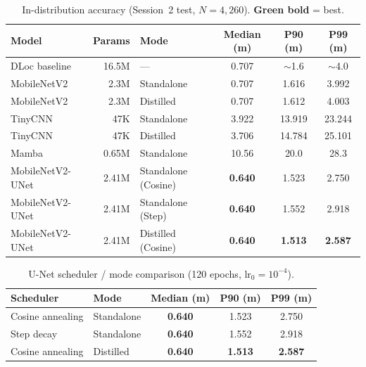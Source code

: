 \documentclass[11pt]{article}
\newcommand{\best}[1]{\textbf{\textcolor{green!50!black}{#1}}}
\begin{document}
\begin{table}[h]\centering\footnotesize
\caption{In-distribution accuracy (Session~2 test, $N=4{,}260$). \best{Green bold} = best.}
\begin{tabular}{@{}lrlccc@{}}
\toprule
\textbf{Model} & \textbf{Params} & \textbf{Mode} & \textbf{Median (m)} & \textbf{P90 (m)} & \textbf{P99 (m)} \\
\midrule
DLoc baseline    & 16.5M & ---                 & 0.707 & $\sim$1.6 & $\sim$4.0 \\
MobileNetV2      & 2.3M  & Standalone          & 0.707 & 1.616 & 3.992 \\
MobileNetV2      & 2.3M  & Distilled           & 0.707 & 1.612 & 4.003 \\
TinyCNN          & 47K   & Standalone          & 3.922 & 13.919 & 23.244 \\
TinyCNN          & 47K   & Distilled           & 3.706 & 14.784 & 25.101 \\
Mamba            & 0.65M & Standalone          & 10.56 & 20.0 & 28.3 \\
MobileNetV2-UNet & 2.41M & Standalone (Cosine) & \best{0.640} & 1.523 & 2.750 \\
MobileNetV2-UNet & 2.41M & Standalone (Step)   & \best{0.640} & 1.552 & 2.918 \\
MobileNetV2-UNet & 2.41M & Distilled (Cosine)  & \best{0.640} & \best{1.513} & \best{2.587} \\
\bottomrule
\end{tabular}
\end{table}

\begin{table}[h]\centering\footnotesize
\caption{U-Net scheduler / mode comparison (120 epochs, $\mathrm{lr}_0=10^{-4}$).}
\begin{tabular}{@{}llccc@{}}
\toprule
\textbf{Scheduler} & \textbf{Mode} & \textbf{Median (m)} & \textbf{P90 (m)} & \textbf{P99 (m)} \\
\midrule
Cosine annealing & Standalone & \best{0.640} & 1.523 & 2.750 \\
Step decay       & Standalone & \best{0.640} & 1.552 & 2.918 \\
Cosine annealing & Distilled  & \best{0.640} & \best{1.513} & \best{2.587} \\
\bottomrule
\end{tabular}
\end{table}
\end{document}
